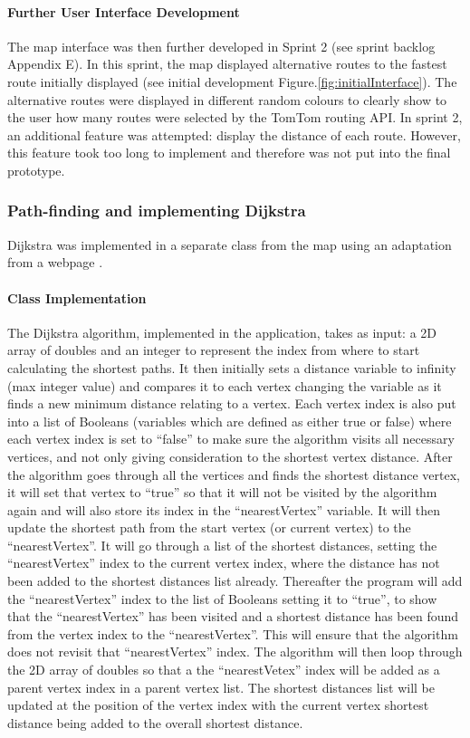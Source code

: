 \documentclass[12pt,a4paper]{article}
\begin{document}
\paragraph{Further User Interface Development}
The map interface was then further developed in Sprint 2 (see sprint backlog Appendix E). In this sprint, the map displayed alternative routes to the fastest route initially displayed (see initial development Figure.\ref{fig:initialInterface}). The alternative routes were displayed in different random colours to clearly show to the user how many routes were selected by the TomTom routing API. In sprint 2, an additional feature was attempted: display the distance of each route. However, this feature took too long to implement and therefore was not put into the final prototype.

\subsubsection{Path-finding and implementing Dijkstra}
Dijkstra was implemented in a separate class from the map using an adaptation from a webpage \cite{Trivedi2019}. 

\paragraph{Class Implementation}
The Dijkstra algorithm, implemented in the application, takes as input: a 2D array of doubles and an integer to represent the index from where to start calculating the shortest paths. It then initially sets a distance variable to infinity (max integer value) and compares it to each vertex changing the variable as it finds a new minimum distance relating to a vertex. Each vertex index is also put into a list of Booleans (variables which are defined as either true or false) where each vertex index is set to \enquote{false} to make sure the algorithm visits all necessary vertices, and not only giving consideration to the shortest vertex distance. After the algorithm goes through all the vertices and finds the shortest distance vertex, it will set that vertex to \enquote{true} so that it will not be visited by the algorithm again and will also store its index in the \enquote{nearestVertex} variable. It will then update the shortest path from the start vertex (or current vertex) to the \enquote{nearestVertex}. It will go through a list of the shortest distances, setting the \enquote{nearestVertex} index to the current vertex index, where the distance has not been added to the shortest distances list already. Thereafter the program will add the \enquote{nearestVertex} index to the list of Booleans setting it to \enquote{true}, to show that the \enquote{nearestVertex} has been visited and a shortest distance has been found from the vertex index to the \enquote{nearestVertex}. This will ensure that the algorithm does not revisit that \enquote{nearestVertex} index. The algorithm will then loop through the 2D array of doubles so that a the \enquote{nearestVetex} index will be added as a parent vertex index in a parent vertex list. The shortest distances list will be updated at the position of the vertex index with the current vertex shortest distance being added to the overall shortest distance. 
\end{document}
